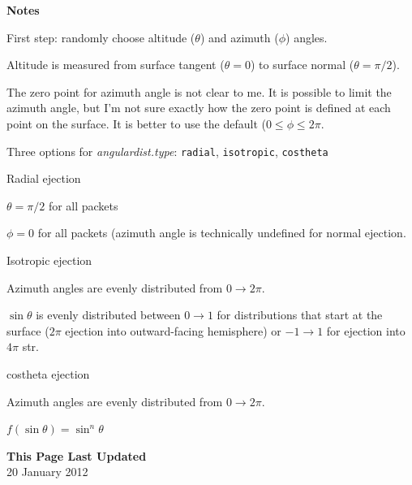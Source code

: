 \documentclass[11pt]{article}
\newcommand\descrip[1]{\textsf{\textbf{\large{#1}}}\\}
\begin{document}
\descrip{Notes}
\begin{compactenum} \listup
\item First step: randomly choose altitude ($\theta$) and azimuth ($\phi$) angles.
  \begin{compactenum}
  \item Altitude is measured from surface tangent ($\theta=0$) to surface normal
  ($\theta=\pi/2$).
  \item The zero point for azimuth angle is not clear to me. It is possible to limit the
  azimuth angle, but I'm not sure exactly how the zero point is defined at each point on
  the surface. It is better to use the default ($0 \leq \phi \leq 2\pi$.
  \item Three options for \textit{angulardist.type}: \texttt{radial}, \texttt{isotropic},
    \texttt{costheta}
  \item Radial ejection
    \begin{compactenum}
    \item $\theta = \pi/2$ for all packets
    \item $\phi = 0$ for all packets (azimuth angle is technically undefined for normal
    ejection.
    \end{compactenum}
  \item Isotropic ejection
    \begin{compactenum} 
    \item Azimuth angles are evenly distributed from $0 \rightarrow 2\pi$.
    \item $\sin \theta$ is evenly distributed between $0 \rightarrow 1$ for distributions
    that start at the surface ($2\pi$ ejection into outward-facing hemisphere) or 
    $-1 \rightarrow 1$ for ejection into $4\pi$ str.
    \end{compactenum}
  \item costheta ejection
    \begin{compactenum}
    \item Azimuth angles are evenly distributed from $0 \rightarrow 2\pi$.
    \item $f(\sin \theta) = \sin^n \theta$
    \end{compactenum}
  \end{compactenum}
\end{compactenum}

\descrip{This Page Last Updated}
20 January 2012

\clearpage
\end{document}
